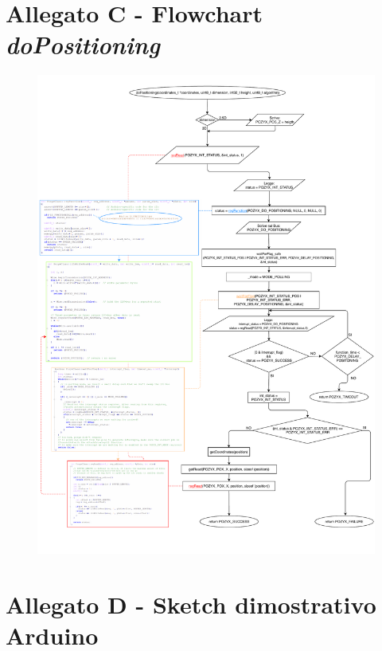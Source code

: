 \documentclass[12pt]{report}
\begin{document}
	\section*{\hypertarget{A3}{\textbf{Allegato C - Flowchart \textit{doPositioning}}}}
	\begin{figure}[H]

		\includegraphics[scale=0.5]{flowchart_doPositioning}
	\end{figure} 
	\newpage

	\section*{\hypertarget{A4}{\textbf{Allegato D - Sketch dimostrativo Arduino}}}
	\lstset{basicstyle=\tiny}
	
	\newpage




\end{document}
